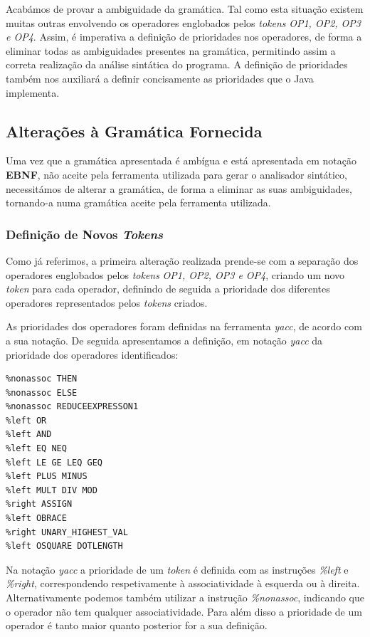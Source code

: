 \documentclass[11pt,a4paper]{article}
\begin{document}
Acabámos de provar a ambiguidade da gramática. Tal como esta situação existem muitas outras envolvendo os operadores englobados pelos \emph{tokens} \emph{OP1, OP2, OP3 e OP4}. Assim, é imperativa a definição de prioridades nos operadores, de forma a eliminar todas as ambiguidades presentes na gramática, permitindo assim a correta realização da análise sintática do programa. A definição de prioridades também nos auxiliará a definir concisamente as prioridades que o Java implementa.

\subsection{Alterações à Gramática Fornecida}

Uma vez que a gramática apresentada é ambígua e está apresentada em notação \textbf{EBNF}, não aceite pela ferramenta utilizada para gerar o analisador sintático, necessitámos de alterar a gramática, de forma a eliminar as suas ambiguidades, tornando-a numa gramática aceite pela ferramenta utilizada.

\subsubsection{Definição de Novos \emph{Tokens}}

Como já referimos, a primeira alteração realizada prende-se com a separação dos operadores englobados pelos \emph{tokens} \emph{OP1, OP2, OP3 e OP4}, criando um novo \emph{token} para cada operador, definindo de seguida a prioridade dos diferentes operadores representados pelos \emph{tokens} criados.

As prioridades dos operadores foram definidas na ferramenta \emph{yacc}, de acordo com a sua notação. De seguida apresentamos a definição, em notação \emph{yacc} da prioridade dos operadores identificados:

\begin{lstlisting}
%nonassoc THEN
%nonassoc ELSE
%nonassoc REDUCEEXPRESSON1
%left OR
%left AND
%left EQ NEQ
%left LE GE LEQ GEQ
%left PLUS MINUS
%left MULT DIV MOD
%right ASSIGN
%left OBRACE
%right UNARY_HIGHEST_VAL
%left OSQUARE DOTLENGTH
\end{lstlisting}

\vspace{0.5cm}

Na notação \emph{yacc} a prioridade de um \emph{token} é definida com as instruções \emph{\%left} e \emph{\%right}, correspondendo respetivamente à associatividade à esquerda ou à direita. Alternativamente podemos também utilizar a instrução \emph{\%nonassoc}, indicando que o operador não tem qualquer associatividade. Para além disso a prioridade de um operador é tanto maior quanto posterior for a sua definição.
\end{document}
